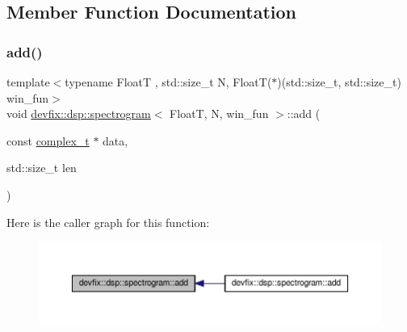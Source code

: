 \subsection{Member Function Documentation}
\mbox{\label{structdevfix_1_1dsp_1_1spectrogram_a9204dfb17067382f9e01295bc349d4f1}} 
\subsubsection{\texorpdfstring{add()}{add()}\hspace{0.1cm}{\footnotesize\ttfamily [1/3]}}
{\footnotesize\ttfamily template$<$typename FloatT , std\+::size\+\_\+t N, Float\+T($\ast$)(std\+::size\+\_\+t, std\+::size\+\_\+t) win\+\_\+fun$>$ \\
void \hyperlink{structdevfix_1_1dsp_1_1spectrogram}{devfix\+::dsp\+::spectrogram}$<$ FloatT, N, win\+\_\+fun $>$\+::add (\begin{DoxyParamCaption}\item[{const \hyperlink{structdevfix_1_1dsp_1_1spectrogram_a920fdda446509cfe81fa287773c709cb}{complex\+\_\+t} $\ast$}]{data,  }\item[{std\+::size\+\_\+t}]{len }\end{DoxyParamCaption})\hspace{0.3cm}{\ttfamily [inline]}}

Here is the caller graph for this function\+:\nopagebreak
\begin{figure}[H]
\begin{center}
\leavevmode
\includegraphics[width=350pt]{structdevfix_1_1dsp_1_1spectrogram_a9204dfb17067382f9e01295bc349d4f1_icgraph}
\end{center}
\end{figure}
\mbox{\label{structdevfix_1_1dsp_1_1spectrogram_abf5e5730f6248014f7ee5a22a0e96662}} 
